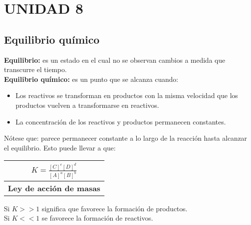\saltoPag{}
\section{UNIDAD 8}
    \subsection{Equilibrio químico}
    \sangria{} \textbf{Equilibrio:} es un estado en el cual no se observan cambios a medida que transcurre el tiempo. \\
\sangria{} \textbf{Equilibrio químico:} es un punto que se alcanza cuando: \begin{itemize} \item Los reactivos se transforman en productos con la misma velocidad que los productos vuelven a transformarse en reactivos. \item La concentración de los reactivos y productos permanecen constantes. \end{itemize}      \sangria{} Nótese que:  parece permanecer constante a lo largo de la reacción hasta alcanzar el equilibrio. Esto puede llevar a que:  \begin{center} \begin{tabular}{|m{6cm}|} \toprule \multicolumn{1}{|c|}{$K = \frac{[C]^c[D]^d}{[A]^a[B]^b}$} \\ \midrule \multicolumn{1}{|c|}{\textbf{Ley de acción de masas}} \\ \bottomrule \end{tabular} \end{center} Si $K >> 1$ significa que favorece la formación de productos. \\ Si $K << 1$ se favorece la formación de reactivos.  \columnbreak{}
